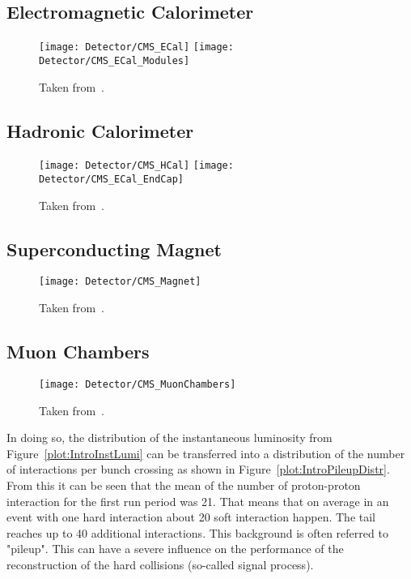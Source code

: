 \subsection{Electromagnetic Calorimeter}

\begin{figure}[!Hhtb]
  \centering
  \texttt{[image: Detector/CMS\_ECal]}
  \texttt{[image: Detector/CMS\_ECal\_Modules]}
  \caption[]{Taken from~. \label{plot:LHCCMSECalCMS}}
\end{figure}

\subsection{Hadronic Calorimeter}

\begin{figure}[!Hhtb]
  \centering
  \texttt{[image: Detector/CMS\_HCal]}
  \texttt{[image: Detector/CMS\_ECal\_EndCap]}
  \caption[]{Taken from~. \label{plot:LHCCMSHCalCMS}}
\end{figure}

\subsection{Superconducting Magnet}

\begin{figure}[!Hhtb]
  \centering
  \texttt{[image: Detector/CMS\_Magnet]}
  \caption[]{Taken from~. \label{plot:LHCCMSMagnetCMS}}
\end{figure}

\subsection{Muon Chambers}

\begin{figure}[!Hhtb]
  \centering
  \texttt{[image: Detector/CMS\_MuonChambers]}
  \caption[]{Taken from~. \label{plot:LHCCMSMuonChambersCMS}}
\end{figure}










In doing so, the distribution of the instantaneous luminosity from Figure~\ref{plot:IntroInstLumi} can be transferred into a distribution of the number of interactions per bunch crossing as shown in Figure~\ref{plot:IntroPileupDistr}. From this it can be seen that the mean of the number of proton-proton interaction for the first run period was 21. That means that on average in an event with one hard interaction about 20 soft interaction happen. The tail reaches up to 40 additional interactions. This background is often referred to "pileup". This can have a severe influence on the performance of the reconstruction of the hard collisions (so-called signal process).

